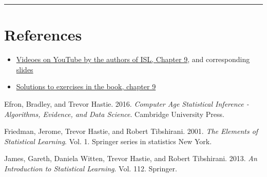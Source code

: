 \documentclass[]{article}
\providecommand{\tightlist}{%
  \setlength{\itemsep}{0pt}\setlength{\parskip}{0pt}}
\begin{document}
\begin{center}\rule{0.5\linewidth}{\linethickness}\end{center}

\hypertarget{references}{%
\section{References}\label{references}}

\begin{itemize}
\tightlist
\item
  \href{https://www.youtube.com/playlist?list=PL5-da3qGB5IDl6MkmovVdZwyYOhpCxo5o}{Videoes
  on YouTube by the authors of ISL, Chapter 9}, and corresponding
  \href{https://lagunita.stanford.edu/c4x/HumanitiesScience/StatLearning/asset/svm.pdf}{slides}
\item
  \href{https://rpubs.com/ppaquay/65566}{Solutions to exercises in the
  book, chapter 9}
\end{itemize}

\hypertarget{refs}{}
\leavevmode\hypertarget{ref-casi}{}%
Efron, Bradley, and Trevor Hastie. 2016. \emph{Computer Age Statistical
Inference - Algorithms, Evidence, and Data Science}. Cambridge
University Press.

\leavevmode\hypertarget{ref-ESL}{}%
Friedman, Jerome, Trevor Hastie, and Robert Tibshirani. 2001. \emph{The
Elements of Statistical Learning}. Vol. 1. Springer series in statistics
New York.

\leavevmode\hypertarget{ref-ISL}{}%
James, Gareth, Daniela Witten, Trevor Hastie, and Robert Tibshirani.
2013. \emph{An Introduction to Statistical Learning}. Vol. 112.
Springer.
\end{document}
